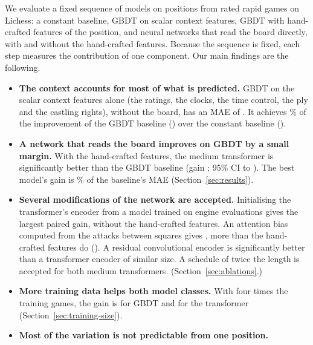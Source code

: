 \documentclass[11pt]{article}
\begin{document}
We evaluate a fixed sequence of models on  positions from rated
rapid games on Lichess: a constant baseline, GBDT on scalar context features,
GBDT with hand-crafted features of the position, and neural networks that
read the board directly, with and without the hand-crafted features. Because
the sequence is fixed, each step measures the contribution of one component.
Our main findings are the following.
\begin{itemize}
\item \textbf{The context accounts for most of what is predicted.} GBDT on
the scalar context features alone (the ratings, the clocks, the time control,
the ply and the castling rights), without the board, has an MAE of
. It achieves \% of the
improvement of the GBDT baseline () over the constant
baseline ().
\item \textbf{A network that reads the board improves on GBDT by a small
margin.} With the hand-crafted features, the medium transformer is
significantly better than the GBDT baseline (gain
; 95\% CI
 to
). The best model's gain is
\% of the baseline's MAE (Section~\ref{sec:results}).
\ifchanges
\item \textbf{Several modifications of the network are
accepted.}\ifchangestart{} Initialising the transformer's encoder from a
model trained on engine evaluations gives the largest paired gain,
 without the
hand-crafted features.\fi\ifchangeattacks{} An attention bias computed from
the attacks between squares gives
, more than the
hand-crafted features do
().\fi\ifchangeconv{}
A residual convolutional encoder is significantly better than a transformer
encoder of similar size.\fi\ifchangeepochs{} A schedule of twice the length
is accepted for both medium transformers.\fi{}
(Section~\ref{sec:ablations}.)
\fi
\ifmore
\item \textbf{More training data helps both model classes.} With four times
the training games, the gain is  for
GBDT and
 for
the transformer (Section~\ref{sec:training-size}).
\fi
\item \textbf{Most of the variation is not predictable from one position.}

\end{itemize}
\end{document}
